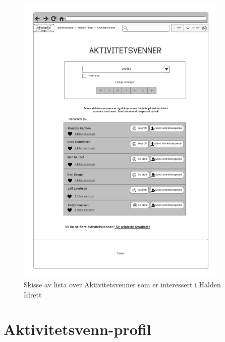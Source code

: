 \begin{figure}[H]
\centering
\includegraphics[width=0.9\textwidth]{Illustrasjoner/Skisser/2.0/2-5-aktivitetsvenner-for-org.png}
\caption{Skisse av lista over Aktivitetsvenner som er interessert i Halden Idrett}
\label{vedlegg:2-5-aktivitetsvenner-org}
\end{figure}

\section{Aktivitetsvenn-profil}

